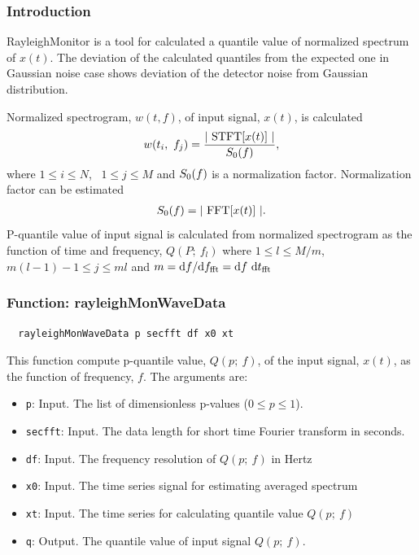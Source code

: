 \subsubsection{\bf Introduction}
RayleighMonitor is a tool for calculated a quantile value of normalized spectrum of $x(t)$.
The deviation of the calculated quantiles from the expected one in Gaussian noise case
shows deviation of the detector noise from Gaussian distribution.

Normalized spectrogram, $w(t, f)$, of input signal, $x(t)$, is calculated
\begin{align*}
  w(t_i,~f_j) = \frac{ |~{\rm STFT}[x(t)]~| }{S_{\rm 0}(f)},
\end{align*}
where $1\leq i\leq N$, ~$1\leq j\leq M$ and $S_{\rm 0}(f)$ is a normalization factor.
Normalization factor can be estimated
\begin{align*}
  S_{\rm 0}(f) = |~{\rm FFT}[x(t)]~|.
\end{align*}
P-quantile value of input signal is calculated from normalized spectrogram as the function of time and frequency,
$Q(P;~f_l)$ where $1\leq l\leq M/m$, $m(l-1)-1\leq j\leq ml$
and $m = {\rm d}f/{\rm d}f_{\rm fft} = {\rm d}f~{\rm d}t_{\rm fft}$

\subsubsection{{\bf Function:} rayleighMonWaveData}
{\tt ~ rayleighMonWaveData p secfft df x0 xt\\}

This function compute p-quantile value, $Q(p;~f)$, of the input signal, $x(t)$, as the function of frequency, $f$.
The arguments are:
\begin{itemize}
\item {\tt p}: Input. The list of dimensionless p-values ($0 \leq p \leq 1$).
\item {\tt secfft}: Input. The data length for short time Fourier transform in seconds.
\item {\tt df}: Input. The frequency resolution of $Q(p;~f)$ in Hertz
\item {\tt x0}: Input. The time series signal for estimating averaged spectrum
\item {\tt xt}: Input. The time series for calculating quantile value $Q(p;~f)$
\item {\tt q}: Output. The quantile value of input signal $Q(p;~f)$.
\end{itemize}

